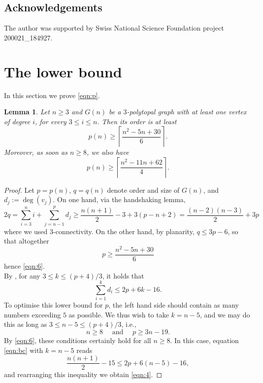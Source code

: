 \documentclass[11pt]{article}
\newtheorem{lemma}[thm]{Lemma}
\theoremstyle{definition}
\numberwithin{equation}{section}
\begin{document}
\subsection{Acknowledgements}
The author was supported by Swiss National Science Foundation project 200021\_184927.




\section{The lower bound}
\label{sec:lb}
In this section we prove \eqref{eqn:p}.
\begin{lemma}
	\label{le:lb}
Let $n\geq 3$ and $G(n)$ be a $3$-polytopal graph with at least one vertex of degree $i$, for every $3\leq i\leq n$. Then its order is at least
\begin{equation}
\label{eqn:6}
p(n)\geq\left\lceil\frac{n^2-5n+30}{6}\right\rceil.
\end{equation}
Moreover, as soon as $n\geq 8$, we also have
\begin{equation}
\label{eqn:4}
p(n)\geq\left\lceil\frac{n^2-11n+62}{4}\right\rceil.
\end{equation}
\end{lemma}
\begin{proof}
Let $p=p(n)$, $q=q(n)$ denote order and size of $G(n)$, and $d_j:=\deg(v_j)$. On one hand, via the handshaking lemma,
\[2q=\sum_{i=3}^{n}i+\sum_{j=n-1}^{p}d_j\geq\frac{n(n+1)}{2}-3+3(p-n+2)=\frac{(n-2)(n-3)}{2}+3p\]
where we used $3$-connectivity. On the other hand, by planarity, $q\leq 3p-6$, so that altogether
\[p\geq\frac{n^2-5n+30}{6}\]
hence \eqref{eqn:6}.
\\
By \cite{bowen1,chvata}, for any $3\leq k\leq (p+4)/3$, it holds that
\begin{equation}
\label{eqn:bc}
\sum_{i=1}^{k}d_i\leq 2p+6k-16.
\end{equation}
To optimise this lower bound for $p$, the left hand side should contain as many numbers exceeding $5$ as possible. We thus wish to take $k=n-5$, and we may do this as long as $3\leq n-5\leq (p+4)/3$, i.e.,
\[n\geq 8 \quad\text{ and }\quad p\geq 3n-19.\]
By \eqref{eqn:6}, these conditions certainly hold for all $n\geq 8$. In this case, equation \eqref{eqn:bc} with $k=n-5$ reads
\[\frac{n(n+1)}{2}-15\leq 2p+6(n-5)-16,\]
and rearranging this inequality we obtain \eqref{eqn:4}.
\end{proof}
\end{document}

